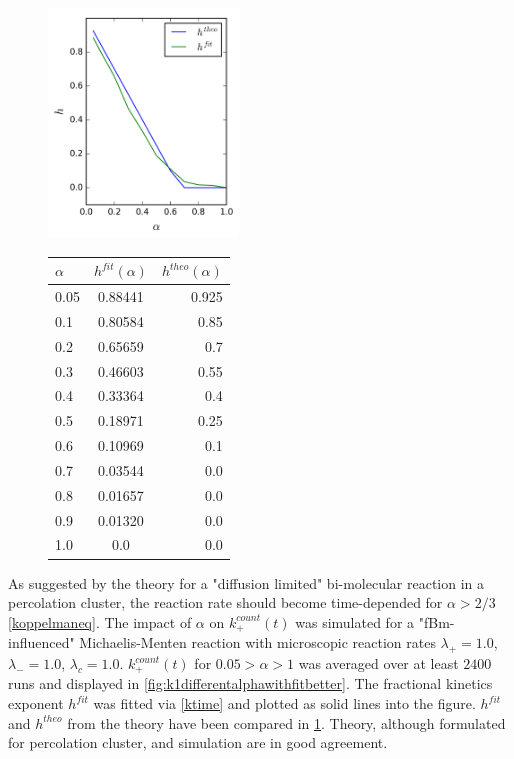 \documentclass[
  a4paper,BCOR10mm,twoside,
  headsepline,footsepline,%
  fleqn,openbib
]{scrbook}
\begin{document}
\begin{figure}[h!]
  \centering
  \includegraphics[width=0.45\textwidth]{./data/hvsalpha.png}
  \qquad
  \begin{tabular}[b]{ l | c | r }
  $\alpha$ & $h^{fit}(\alpha)$ & $h^{theo}(\alpha)$ \\
  \hline
  0.05 & 0.88441 & 0.925 \\
  0.1 & 0.80584 & 0.85 \\
  0.2 & 0.65659 & 0.7 \\
  0.3 & 0.46603 &  0.55  \\
  0.4 & 0.33364 & 0.4 \\
  0.5 & 0.18971 & 0.25 \\
  0.6 & 0.10969 & 0.1 \\
  0.7 & 0.03544 & 0.0 \\
  0.8 & 0.01657 & 0.0 \\
  0.9 & 0.01320 & 0.0 \\
  1.0 & 0.0 & 0.0\vspace{1.0cm}
  \end{tabular}
  \captionsetup{labelformat=andtable}
  \label{fig:k1differentalphawithfitbetter1}
\end{figure}
As suggested by the theory for a "diffusion limited" bi-molecular reaction in a percolation cluster, the reaction rate should become time-depended for $\alpha>2/3$ \cref{koppelmaneq}. The impact of $\alpha$ on $k^{count}_+(t)$ was simulated for a "fBm-influenced" Michaelis-Menten reaction with microscopic reaction rates  $\lambda_+=1.0$, $\lambda_-=1.0$,  $\lambda_c=1.0$.  $k^{count}_+(t)$ for $0.05>\alpha>1$ was averaged over at least $2400$ runs and displayed in \cref{fig:k1differentalphawithfitbetter}. The fractional kinetics exponent $h^{fit}$ was fitted via \cref{ktime} and plotted as solid lines into the figure. $h^{fit}$ and $h^{theo}$ from the theory have been compared in \cref{fig:k1differentalphawithfitbetter1}. Theory, although formulated for percolation cluster, and simulation are in good agreement.
\end{document}
